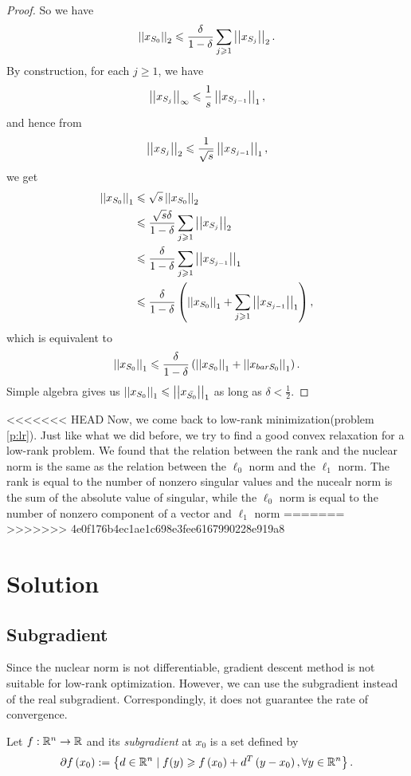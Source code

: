 \documentclass[11pt]{article}
\begin{document}
\begin{proof}
So we have
\[\left|\left|x_{S_0}\right|\right|_2\leqslant\frac{\delta}{1-\delta}\sum_{j\geqslant 1}\left|\left|x_{S_j}\right|\right|_2.\]
By construction, for each \(j \geqslant 1\), we have
\[\left|\left|x_{S_j}\right|\right|_\infty\leqslant\frac1s\left|\left|x_{S_{j-1}}\right|\right|_1,\]
and hence from
\[\left|\left|x_{S_j}\right|\right|_2\leqslant\frac{1}{\sqrt s}\left|\left|x_{S_{j-1}}\right|\right|_1,\]
we get
\[\begin{aligned}
    \left|\left|x_{S_0}\right|\right|_1
    &\leqslant \sqrt s\left|\left|x_{S_0}\right|\right|_2\\
    &\leqslant \frac{\sqrt s\delta}{1-\delta}\sum_{j\geqslant 1}\left|\left|x_{S_j}\right|\right|_2\\
    &\leqslant \frac{\delta}{1-\delta}\sum_{j\geqslant 1}\left|\left|x_{S_{j-1}}\right|\right|_1\\
    &\leqslant \frac{\delta}{1-\delta}\left(\left|\left|x_{S_0}\right|\right|_1+\sum_{j\geqslant 1}\left|\left|x_{S_{j-1}}\right|\right|_1\right),
\end{aligned}\]
which is equivalent to
\[\left|\left|x_{S_0}\right|\right|_1\leqslant\frac{\delta}{1-\delta}\left(\left|\left|x_{S_0}\right|\right|_1+\left|\left|x_{bar{S_0}}\right|\right|_1\right).\]
Simple algebra gives us \(\left|\left|x_{S_0}\right|\right|_1\leqslant\left|\left|x_{\bar{S_0}}\right|\right|_1\) as long as \(\delta<\frac{1}{2}\).
\end{proof}

<<<<<<< HEAD
Now, we come back to low-rank minimization(problem \ref{p:lr}). Just like what we did before, we try to find a good convex relaxation for a low-rank problem. 
We found that the relation between the rank and the nuclear norm  is the same as the relation between the \(\ell_0\) norm and the \(\ell_1\) norm. The rank is equal to the number of nonzero singular values and the nucealr norm is the sum of the absolute value of singular, while the \(\ell_0\) norm is equal to the number of nonzero component of a vector and \(\ell_1\) norm
=======
>>>>>>> 4e0f176b4ec1ae1c698e3fee6167990228e919a8
\section{Solution}

\subsection{Subgradient}

Since the nuclear norm is not differentiable, gradient descent method is not suitable for low-rank optimization. However, we can use the subgradient instead of the real subgradient. Correspondingly, it does not guarantee the rate of convergence.



\begin{definition}[Subgradient]
    Let \(f:\mathbb R^n \to \mathbb R\) and its \emph{subgradient} at \(x_0\) is a set defined by
    \[\partial f\left(x_0\right) := \left\{d \in \mathbb R^n \mid f(y)\geqslant f\left(x_0\right) + d^T \left(y-x_0\right),\forall y \in \mathbb R^n\right\}.\]
\end{definition}
\end{document}
